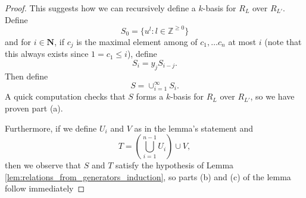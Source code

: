 \documentclass{amsart}
\theoremstyle{plain}
\theoremstyle{definition}
\theoremstyle{remark}
\numberwithin{equation}{section}
\newcommand \halfcan{L}
\begin{document}
\begin{proof}
This suggests how we can recursively define a $k$-basis for $R_\halfcan$ over $R_{\halfcan'}$.  Define 
\[
	S_0 = \{u^l : l\in \mathbb{Z}^{\ge 0}\}
\]
and for $i \in \mathbf{N}$, if $c_j$ is the maximal element among of $c_1, \ldots c_n$ at most $i$ (note that this always exists since $1=c_1\le i$), define
\[
	S_i = y_j S_{i-j}.
\]
Then define 
\[
	S = \cup_{i=1}^{\infty} S_i.
\]
A quick computation checks that $S$ forms a $k$-basis for $R_\halfcan$ over $R_{\halfcan'}$, so we have proven part (a).

Furthermore, if we define $U_i$ and $V$ as in the lemma's statement and
\[
	T = (\bigcup_{i=1}^{n-1} U_i) \cup V,
\]
then we observe that $S$ and $T$ satisfy the hypothesis of Lemma \ref{lem:relations_from_generators_induction}, so parts (b) and (c) of the lemma follow immediately







\end{proof}
\end{document}
